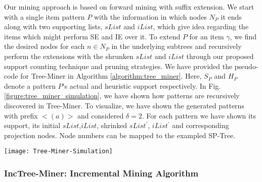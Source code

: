 Our mining approach is based on forward mining with suffix extension. We start with a single item pattern $P$ with the information in which nodes $N_{P}$ it ends along with two supporting lists, $sList$ and $iList$, which give idea regarding the items which might perform SE and IE over it. To extend $P$ for an item $\gamma$, we find the desired nodes for each $n \in N_{P}$ in the underlying subtrees and recursively perform the extensions with the shrunken $sList$ and $iList$ through our proposed support counting technique and pruning strategies. We have provided the pseudo-code for Tree-Miner in Algorithm \ref{algorithm:tree_miner}. Here, $S_{P}$ and $H_{P}$ denote a pattern $P$'s actual and heuristic support respectively. In Fig. \ref{figure:tree_miner_simulation}, we have shown how patterns are recursively discovered in Tree-Miner. To visualize, we have shown the generated patterns with prefix $< (a) >$ and considered $\delta=2$. For each pattern we have shown its support, its initial $sList$,$iList$, shrinked $sList^{\prime}$, $iList^{\prime}$ and corresponding projection nodes. Node numbers can be mapped to the exampled SP-Tree.     



\begin{figure*}[!tb]
\centering
\texttt{[image: Tree-Miner-Simulation]}
\caption{Simulation of Tree-Miner for the patterns with prefix $< (a) >$} \label{figure:tree_miner_simulation}
\hfil
\end{figure*}

\subsubsection{IncTree-Miner: Incremental Mining Algorithm}



